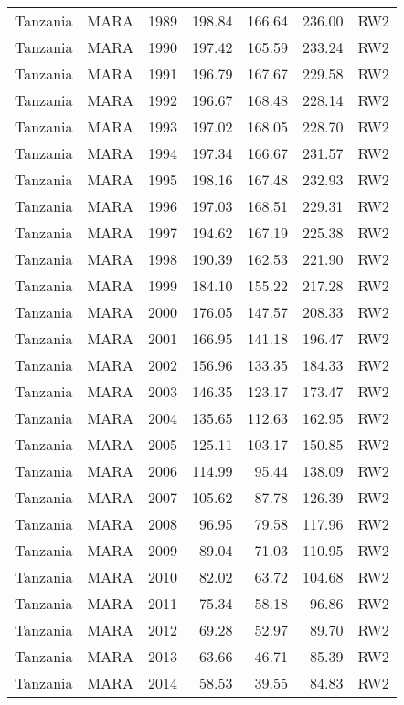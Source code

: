 \begin{longtable}{lllrrrl}
  Tanzania & MARA & 1989 & 198.84 & 166.64 & 236.00 & RW2 \\ 
  Tanzania & MARA & 1990 & 197.42 & 165.59 & 233.24 & RW2 \\ 
  Tanzania & MARA & 1991 & 196.79 & 167.67 & 229.58 & RW2 \\ 
  Tanzania & MARA & 1992 & 196.67 & 168.48 & 228.14 & RW2 \\ 
  Tanzania & MARA & 1993 & 197.02 & 168.05 & 228.70 & RW2 \\ 
  Tanzania & MARA & 1994 & 197.34 & 166.67 & 231.57 & RW2 \\ 
  Tanzania & MARA & 1995 & 198.16 & 167.48 & 232.93 & RW2 \\ 
  Tanzania & MARA & 1996 & 197.03 & 168.51 & 229.31 & RW2 \\ 
  Tanzania & MARA & 1997 & 194.62 & 167.19 & 225.38 & RW2 \\ 
  Tanzania & MARA & 1998 & 190.39 & 162.53 & 221.90 & RW2 \\ 
  Tanzania & MARA & 1999 & 184.10 & 155.22 & 217.28 & RW2 \\ 
  Tanzania & MARA & 2000 & 176.05 & 147.57 & 208.33 & RW2 \\ 
  Tanzania & MARA & 2001 & 166.95 & 141.18 & 196.47 & RW2 \\ 
  Tanzania & MARA & 2002 & 156.96 & 133.35 & 184.33 & RW2 \\ 
  Tanzania & MARA & 2003 & 146.35 & 123.17 & 173.47 & RW2 \\ 
  Tanzania & MARA & 2004 & 135.65 & 112.63 & 162.95 & RW2 \\ 
  Tanzania & MARA & 2005 & 125.11 & 103.17 & 150.85 & RW2 \\ 
  Tanzania & MARA & 2006 & 114.99 & 95.44 & 138.09 & RW2 \\ 
  Tanzania & MARA & 2007 & 105.62 & 87.78 & 126.39 & RW2 \\ 
  Tanzania & MARA & 2008 & 96.95 & 79.58 & 117.96 & RW2 \\ 
  Tanzania & MARA & 2009 & 89.04 & 71.03 & 110.95 & RW2 \\ 
  Tanzania & MARA & 2010 & 82.02 & 63.72 & 104.68 & RW2 \\ 
  Tanzania & MARA & 2011 & 75.34 & 58.18 & 96.86 & RW2 \\ 
  Tanzania & MARA & 2012 & 69.28 & 52.97 & 89.70 & RW2 \\ 
  Tanzania & MARA & 2013 & 63.66 & 46.71 & 85.39 & RW2 \\ 
  Tanzania & MARA & 2014 & 58.53 & 39.55 & 84.83 & RW2 \\ 

\end{longtable}
